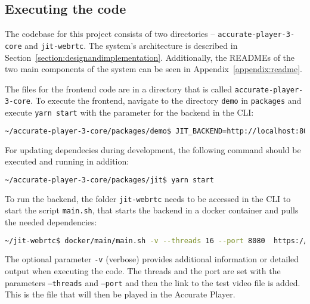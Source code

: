 \documentclass[../MasterThesis.tex]{subfiles}
\begin{document}
\subsection{Executing the code} \label{subsection:runninghtecode}

The codebase for this project consists of two directories -- \texttt{accurate-player-3-core} and \texttt{jit-webrtc}. The system's architecture is described in Section~\ref{section:designandimplementation}. Additionally, the READMEs of the two main components of the system can be seen in Appendix~\ref{appendix:readme}.


The files for the frontend code are in a directory that is called \texttt{accurate-player-3-core}. To execute the frontend, navigate to the directory \texttt{demo} in \texttt{packages} and execute \texttt{yarn start} with the parameter for the backend in the CLI:
\begin{lstlisting}[language=bash, numbers=none]
	~/accurate-player-3-core/packages/demo$ JIT_BACKEND=http://localhost:8080 yarn start
\end{lstlisting}

For updating dependecies during development, the following command should be executed and running in addition: 
\begin{lstlisting}[language=bash, numbers=none]
	~/accurate-player-3-core/packages/jit$ yarn start
\end{lstlisting}



To run the backend, the folder \texttt{jit-webrtc} needs to be accessed in the CLI to start the script \texttt{main.sh}, that starts the backend in a docker container and pulls the needed dependencies:
\begin{lstlisting}[language=bash, numbers=none]
	~/jit-webrtc$ docker/main/main.sh -v --threads 16 --port 8080  https://s3.eu-central-1.amazonaws.com/accurate-player-demo-assets/timecode/sintel-2048-timecode-stereo.mp4
\end{lstlisting}

The optional parameter \texttt{-v} (verbose) provides additional information or detailed output when executing the code. The threads and the port are set with the parameters \texttt{--threads} and \texttt{--port} and then the link to the test video file is added. This is the file that will then be played in the Accurate Player.






	
	
	

	
	
\end{document}
